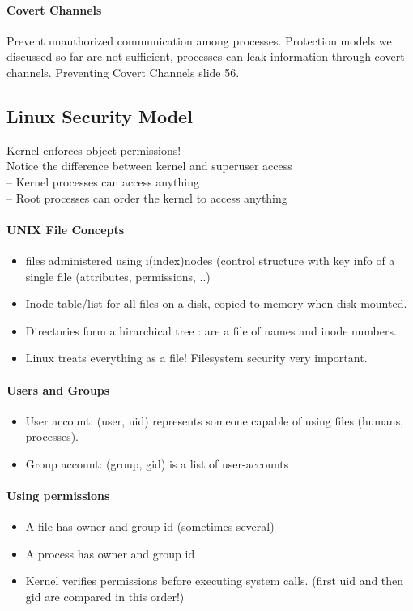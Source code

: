 \paragraph{Covert Channels}
Prevent unauthorized communication among processes. Protection models we discussed so far are not sufficient, processes can leak information through covert channels. Preventing Covert Channels slide 56.

\subsection{Linux Security Model}
Kernel enforces object permissions! \\
Notice the difference between kernel and superuser access\\
– Kernel processes can access anything\\
– Root processes can order the kernel to access anything\\

\paragraph{UNIX File Concepts}
\begin{itemize}
    \item files administered using i(index)nodes (control structure with key info of a single file (attributes, permissions, ..)
    \item Inode table/list for all files on a disk, copied to memory when disk mounted.
    \item Directories form a hirarchical tree : are a file of names and inode numbers.
    \item Linux treats everything as a file! Filesystem security very important.
\end{itemize}

\paragraph{Users and Groups}
\begin{itemize}
    \item User account: (user, uid) represents someone capable of using files (humans, processes).
    \item Group account: (group, gid) is a list of user-accounts
\end{itemize}

\paragraph{Using permissions}
\begin{itemize}
    \item A file has owner and group id (sometimes several)
    \item A process has owner and group id
    \item Kernel verifies permissions before executing system calls. (first uid and then gid are compared in this order!)
\end{itemize}

